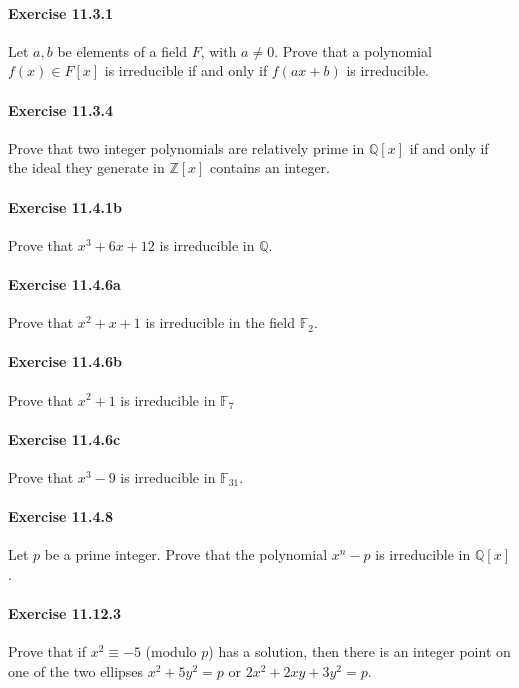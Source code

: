 \documentclass{article}
\begin{document}
\paragraph{Exercise 11.3.1} Let $a, b$ be elements of a field $F$, with $a \neq 0$. Prove that a polynomial $f(x) \in F[x]$ is irreducible if and only if $f(a x+b)$ is irreducible.


\paragraph{Exercise 11.3.4} Prove that two integer polynomials are relatively prime in $\mathbb{Q}[x]$ if and only if the ideal they generate in $\mathbb{Z}[x]$ contains an integer.


\paragraph{Exercise 11.4.1b} Prove that $x^3 + 6x + 12$ is irreducible in $\mathbb{Q}$.


\paragraph{Exercise 11.4.6a} Prove that $x^2+x+1$ is irreducible in the field $\mathbb{F}_2$.


\paragraph{Exercise 11.4.6b} Prove that $x^2+1$ is irreducible in $\mathbb{F}_7$


\paragraph{Exercise 11.4.6c} Prove that $x^3 - 9$ is irreducible in $\mathbb{F}_{31}$.


\paragraph{Exercise 11.4.8} Let $p$ be a prime integer. Prove that the polynomial $x^n-p$ is irreducible in $\mathbb{Q}[x]$.


\paragraph{Exercise 11.12.3} Prove that if $x^2 \equiv-5$ (modulo $p$) has a solution, then there is an integer point on one of the two ellipses $x^2+5 y^2=p$ or $2 x^2+2 x y+3 y^2=p$.
\end{document}
